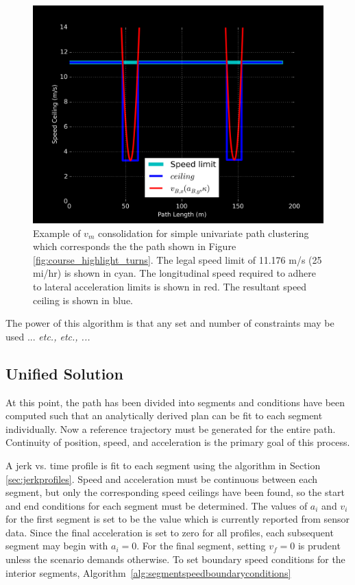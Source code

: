 \documentclass[letterpaper, 10 pt, conference]{ieeeconf}  %
\begin{document}
\begin{figure}[thpb]
  \centering
  \includegraphics[width=0.8\columnwidth]{graphics/speed_ceiling.png}
  \caption{Example of $v_m$ consolidation for simple univariate path clustering which corresponds the the path shown in Figure \ref{fig:course_highlight_turns}. The legal speed limit of 11.176 m/s (25 mi/hr) is shown in cyan. The longitudinal speed required to adhere to lateral acceleration limits is shown in red. The resultant speed ceiling is shown in blue.}
  \label{fig:consolidation_speed_ceiling}
\end{figure}

The power of this algorithm is that any set and number of constraints may be used ... \emph{etc., etc., ...}\tabularnewline


\subsection{Unified Solution} \label{sec:unifiedsolution}

At this point, the path has been divided into segments and conditions have been computed such that an analytically derived plan can be fit to each segment individually.
Now a reference trajectory must be generated for the entire path.
Continuity of position, speed, and acceleration is the primary goal of this process.

A jerk vs. time profile is fit to each segment using the algorithm in Section \ref{sec:jerkprofiles}.
Speed and acceleration must be continuous between each segment, but only the corresponding speed ceilings have been found, so the start and end conditions for each segment must be determined.
The values of $a_i$ and $v_i$ for the first segment is set to be the value which is currently reported from sensor data.
Since the final acceleration is set to zero for all profiles, each subsequent segment may begin with $a_i = 0$.
For the final segment, setting $v_f = 0$ is prudent unless the scenario demands otherwise.
To set boundary speed conditions for the interior segments, Algorithm~\ref{alg:segmentspeedboundaryconditions}
\end{document}
